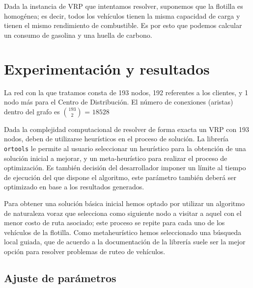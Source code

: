 \documentclass[journal]{IEEEtran}
\begin{document}
            Dada la instancia de VRP que intentamos resolver, suponemos que la flotilla es homogénea; es decir, todos los vehículos tienen la misma capacidad de carga y tienen el mismo rendimiento de combustible. Es por esto que podemos calcular un consumo de gasolina y una huella de carbono.
            
    \section{Experimentación y resultados} \label{sec:experimentation}
    
        La red con la que tratamos consta de 193 nodos, 192 referentes a los clientes, y 1 nodo más para el Centro de Distribución. El número de conexiones (aristas) dentro del grafo es $193\choose2$ = $18528$
        
        Dada la complejidad computacional de resolver de forma exacta un VRP con 193 nodos, deben de utilizarse heurísticos en el proceso de solución. La librería \texttt{ortools} \cite{ortools} le permite al usuario seleccionar un heurístico para la obtención de una solución inicial a mejorar, y un meta-heurístico para realizar el proceso de optimización. Es también decisión del desarrollador imponer un límite al tiempo de ejecución del que dispone el algoritmo, este parámetro también deberá ser optimizado en base a los resultados generados.

        Para obtener una solución básica inicial hemos optado por utilizar un algoritmo de naturaleza voraz que selecciona como siguiente nodo a visitar a aquel con el menor costo de ruta asociado; este proceso se repite para cada uno de los vehículos de la flotilla. Como metaheurístico hemos seleccionado una búsqueda local guiada, que de acuerdo a la documentación de la librería \cite{google-2021} suele ser la mejor opción para resolver problemas de ruteo de vehículos.

        \subsection{Ajuste de parámetros} \label{sec:parameter-tuning}
            
\end{document}
